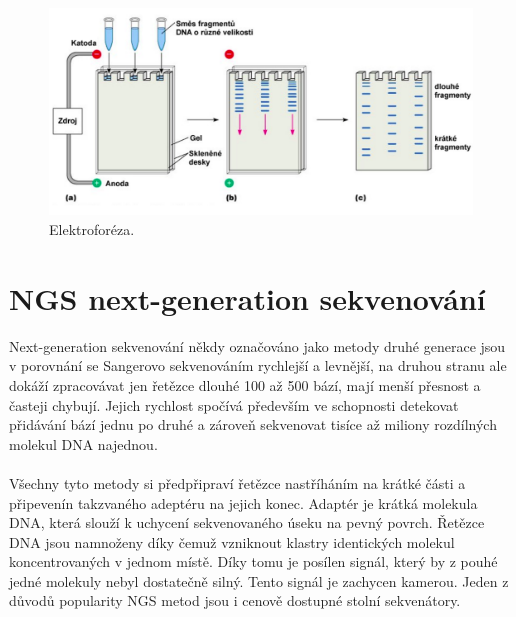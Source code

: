 \documentclass[czech,DP]{thesiskiv}
\numberwithin{equation}{section}
\begin{document}
\begin{figure}[H]		
		\centering
		\includegraphics[width=\textwidth]{./img/elektroforeza.png}
		\caption{Elektroforéza. \cite{elektroforeza_img}}
		\label{fig:elektroforeza}
\end{figure}
 
\section{NGS next-generation sekvenování}
Next-generation sekvenování někdy označováno jako metody druhé generace jsou v porovnání se Sangerovo sekvenováním rychlejší a levnější, na druhou stranu ale dokáží zpracovávat jen řetězce dlouhé 100 až 500 bází, mají menší přesnost a časteji chybují. Jejich rychlost spočívá především ve schopnosti detekovat přidávání bází jednu po druhé a zároveň sekvenovat tisíce až miliony rozdílných molekul DNA najednou. 
\\
\\
Všechny tyto metody si předpřipraví řetězce nastříháním na krátké části a připevenín takzvaného adeptéru na jejich konec. Adaptér je krátká molekula DNA, která slouží k uchycení sekvenovaného úseku na pevný povrch. Řetězce DNA jsou namnoženy díky čemuž vzniknout klastry identických molekul koncentrovaných v jednom místě. Díky tomu je posílen signál, který by z pouhé jedné molekuly nebyl dostatečně silný. Tento signál je zachycen kamerou. Jeden z důvodů popularity NGS metod jsou i cenově dostupné stolní sekvenátory.
 
\end{document}
